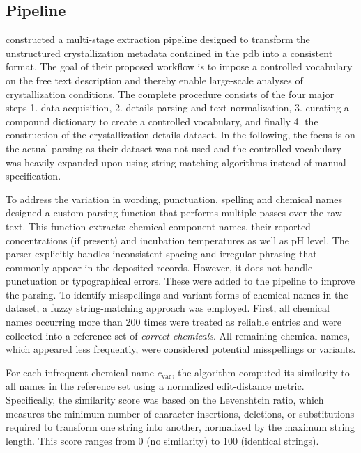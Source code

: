\subsection{Pipeline}\label{sec:data_normalization/pipeline}
\textcite{Lynch2020} constructed a multi-stage extraction pipeline designed to transform the unstructured crystallization metadata contained in the \gls{pdb}
into a consistent format. The goal of their proposed workflow is to impose a controlled vocabulary on the free text description and thereby enable large-scale analyses of crystallization conditions. The complete procedure consists of the four major steps 1. data acquisition, 2. details parsing and text normalization, 3. curating a compound dictionary to create a controlled vocabulary, and finally 4. the construction of the crystallization details dataset. In the following, the focus is on the actual parsing as their dataset was not used and the controlled vocabulary was heavily expanded upon using string matching algorithms instead of manual specification. 

To address the variation in wording, punctuation, spelling and chemical names \citet{Lynch2020} designed a custom parsing function that performs multiple passes over the raw text. This function extracts: chemical component names, their reported concentrations (if present) and incubation temperatures as well as pH level. The parser explicitly handles inconsistent spacing and irregular phrasing that commonly appear in the deposited records. However, it does not handle punctuation or typographical errors. These were added to the pipeline to improve the parsing. 
To identify misspellings and variant forms of chemical names in the dataset, a fuzzy string-matching approach was employed. First, all chemical names occurring more than 200 times were treated as reliable entries and were collected into a reference set of \emph{correct chemicals}. All remaining chemical names, which appeared less frequently, were considered potential misspellings or variants.

For each infrequent chemical name $c_\text{var}$, the algorithm computed its similarity to all names in the reference set using a normalized edit-distance metric. Specifically, the similarity score was based on the Levenshtein ratio, which measures the minimum number of character insertions, deletions, or substitutions required to transform one string into another, normalized by the maximum string length. This score ranges from 0 (no similarity) to 100 (identical strings).


